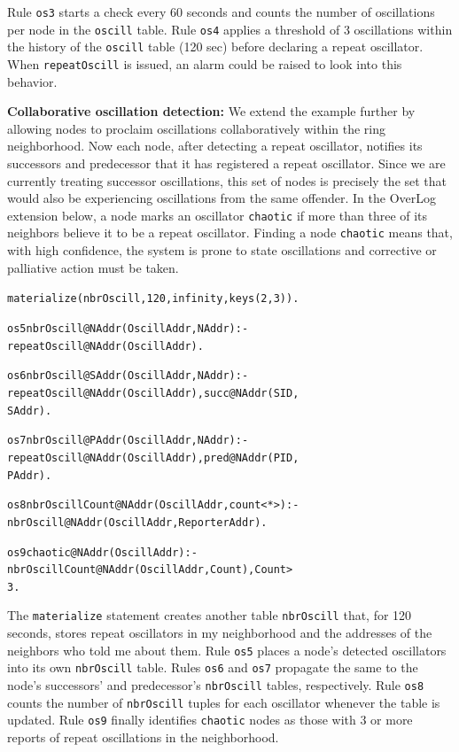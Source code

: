 \documentclass{sig-alt-full}
\renewcommand{\paragraph}[1]{{\bf #1:}}
\newenvironment{overlog}{\begin{alltt}\footnotesize}{\end{alltt}}
\newcommand{\ol}[1]{{\tt\footnotesize#1}}
\begin{document}
Rule \ol{os3} starts a check every 60 seconds and
counts the number of oscillations
per node in the \ol{oscill} table.   Rule
\ol{os4} applies a threshold of 3 oscillations within the history of the
\ol{oscill} table (120 sec) before declaring a repeat oscillator.  When
\ol{repeatOscill} is
issued, an alarm could be raised to look into this behavior.


\paragraph{Collaborative oscillation detection}
We extend the example further by allowing nodes to proclaim oscillations
collaboratively within the ring neighborhood.  Now each node, after
detecting a repeat oscillator, notifies its successors
and predecessor that it has registered a repeat
oscillator.   Since we are currently treating successor oscillations, this
set of nodes is precisely the set that would also be experiencing
oscillations from the same offender.  In the OverLog extension below, a
node marks an oscillator \ol{chaotic} if more than three of its
neighbors believe it to be a repeat oscillator.  Finding a node
\ol{chaotic} means that, with high confidence, the system is prone to
state oscillations and corrective or palliative action must be taken. 
\begin{overlog}
materialize(nbrOscill, 120, infinity, keys(2,3)).

os5 nbrOscill@NAddr(OscillAddr, NAddr) :-
   repeatOscill@NAddr(OscillAddr).

os6 nbrOscill@SAddr(OscillAddr, NAddr) :-
   repeatOscill@NAddr(OscillAddr), succ@NAddr(SID,
   SAddr).

os7 nbrOscill@PAddr(OscillAddr, NAddr) :-
   repeatOscill@NAddr(OscillAddr), pred@NAddr(PID,
   PAddr).

os8 nbrOscillCount@NAddr(OscillAddr, count<*>) :-
   nbrOscill@NAddr(OscillAddr, ReporterAddr).

os9 chaotic@NAddr(OscillAddr) :-
   nbrOscillCount@NAddr(OscillAddr, Count), Count >
   3.
\end{overlog}
The \ol{materialize} statement creates another table
\ol{nbrOscill} that, for 120 seconds, stores repeat
oscillators in my neighborhood and the addresses of the
neighbors who told me about them.  Rule \ol{os5}
places a node's detected oscillators into its own
\ol{nbrOscill} table. Rules \ol{os6} and
\ol{os7} propagate the same to the node's
successors' and predecessor's \ol{nbrOscill} tables,
respectively.  Rule \ol{os8} counts the number of
\ol{nbrOscill} tuples for each oscillator whenever the
table is updated.  Rule \ol{os9} finally identifies
\ol{chaotic} nodes as those with 3 or more reports of
repeat oscillations in the neighborhood.
\end{document}

